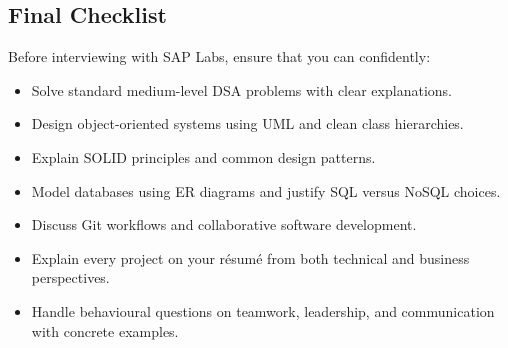 \documentclass[11pt,a4paper]{article}
\begin{document}

\subsection{Final Checklist}

Before interviewing with SAP Labs, ensure that you can confidently:

\begin{itemize}
	\item Solve standard medium-level DSA problems with clear explanations.
	\item Design object-oriented systems using UML and clean class hierarchies.
	\item Explain SOLID principles and common design patterns.
	\item Model databases using ER diagrams and justify SQL versus NoSQL choices.
	\item Discuss Git workflows and collaborative software development.
	\item Explain every project on your résumé from both technical and business perspectives.
	\item Handle behavioural questions on teamwork, leadership, and communication with concrete examples.
\end{itemize}
\end{document}
